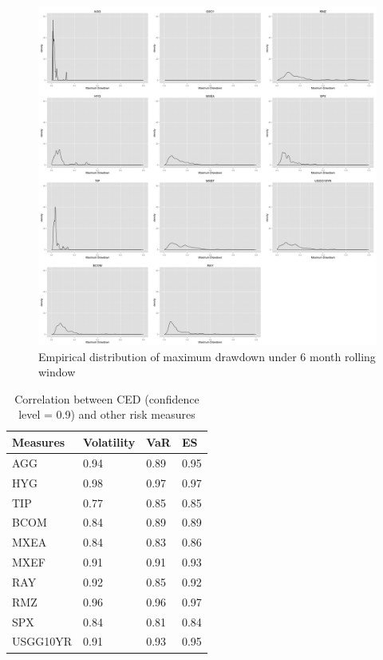 \documentclass[11pt]{article}
\begin{document}
\begin{figure}[H]
\centering
\includegraphics[width=15cm]{../results/maxdd_dist_mon6}
\caption{Empirical distribution of maximum drawdown under 6 month rolling window} 
\label{fig: dist_mdd}
\end{figure}

\begin{table}
\caption{Correlation between CED (confidence level = 0.9) and other risk measures}
\centering 
\begin{tabular}{| p{2cm}||p{2cm}|p{2cm}|p{2cm}|} 
\hline
Measures & Volatility & VaR & ES\\
  \hline
AGG & 0.94 & 0.89 & 0.95\\ 
HYG & 0.98 & 0.97 & 0.97\\ 
TIP & 0.77 & 0.85 & 0.85\\ 
BCOM & 0.84 & 0.89 & 0.89\\ 
MXEA & 0.84 & 0.83 & 0.86\\ 
MXEF & 0.91 & 0.91 & 0.93\\ 
RAY & 0.92 & 0.85 & 0.92\\ 
RMZ & 0.96 & 0.96 & 0.97\\ 
SPX & 0.84 & 0.81 & 0.84\\ 
USGG10YR & 0.91 & 0.93 & 0.95\\
\hline
\end{tabular}
\label{table:corrRiskMeasureCED}
\end{table}
\end{document}
